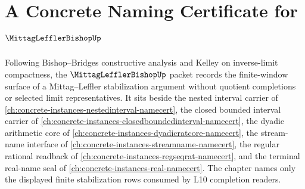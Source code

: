 \chapter{A Concrete Naming Certificate for $\MittagLefflerBishopUp$}
\label{ch:concrete-instances-mittag-leffler-bishop-namecert}

Following Bishop--Bridges constructive analysis and Kelley on inverse-limit compactness, the $\MittagLefflerBishopUp$ packet records the finite-window surface of a Mittag--Leffler stabilization argument without quotient completions or selected limit representatives. It sits beside the nested interval carrier of \autoref{ch:concrete-instances-nestedinterval-namecert}, the closed bounded interval carrier of \autoref{ch:concrete-instances-closedboundedinterval-namecert}, the dyadic arithmetic core of \autoref{ch:concrete-instances-dyadicratcore-namecert}, the stream-name interface of \autoref{ch:concrete-instances-streamname-namecert}, the regular rational readback of \autoref{ch:concrete-instances-regseqrat-namecert}, and the terminal real-name seal of \autoref{ch:concrete-instances-real-namecert}. The chapter names only the displayed finite stabilization rows consumed by L10 completion readers.

